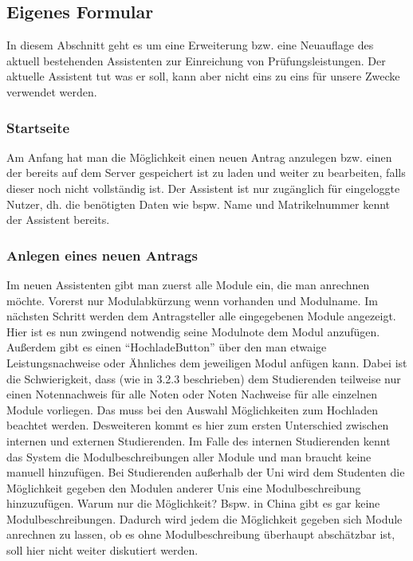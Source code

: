 \subsection{Eigenes Formular}
In diesem Abschnitt geht es um eine Erweiterung bzw. eine Neuauflage des aktuell bestehenden Assistenten zur Einreichung von Prüfungsleistungen. Der aktuelle Assistent tut was er soll, kann aber nicht eins zu eins für unsere Zwecke verwendet werden.

\subsubsection{Startseite}
Am Anfang hat man die Möglichkeit einen neuen Antrag anzulegen bzw. einen der bereits auf dem Server gespeichert ist zu laden und weiter zu bearbeiten, falls dieser noch nicht vollständig ist. Der Assistent ist nur zugänglich für eingeloggte Nutzer, dh. die benötigten Daten wie bspw. Name und Matrikelnummer kennt der Assistent bereits.

\subsubsection{Anlegen eines neuen Antrags}
Im neuen Assistenten gibt man zuerst alle Module ein, die man anrechnen möchte. Vorerst nur Modulabkürzung wenn vorhanden und Modulname. Im nächsten Schritt werden dem Antragsteller alle eingegebenen Module angezeigt.
Hier ist es nun zwingend notwendig seine Modulnote dem Modul anzufügen. Außerdem gibt es einen “HochladeButton” über den man etwaige Leistungsnachweise oder Ähnliches dem jeweiligen Modul anfügen kann. Dabei ist die Schwierigkeit, dass (wie in 3.2.3 beschrieben) dem Studierenden teilweise nur einen Notennachweis für alle Noten oder Noten Nachweise für alle einzelnen Module vorliegen. Das muss bei den Auswahl Möglichkeiten zum Hochladen beachtet werden.
Desweiteren kommt es hier zum ersten Unterschied zwischen internen und externen Studierenden. Im Falle des internen Studierenden kennt das System die Modulbeschreibungen aller Module und man braucht keine manuell hinzufügen. Bei Studierenden außerhalb der Uni wird dem Studenten die Möglichkeit gegeben den Modulen anderer Unis eine Modulbeschreibung hinzuzufügen. Warum nur die Möglichkeit? Bspw. in China gibt es gar keine Modulbeschreibungen. Dadurch wird jedem die Möglichkeit gegeben sich Module anrechnen zu lassen, ob es ohne Modulbeschreibung überhaupt abschätzbar ist, soll hier nicht weiter diskutiert werden.

